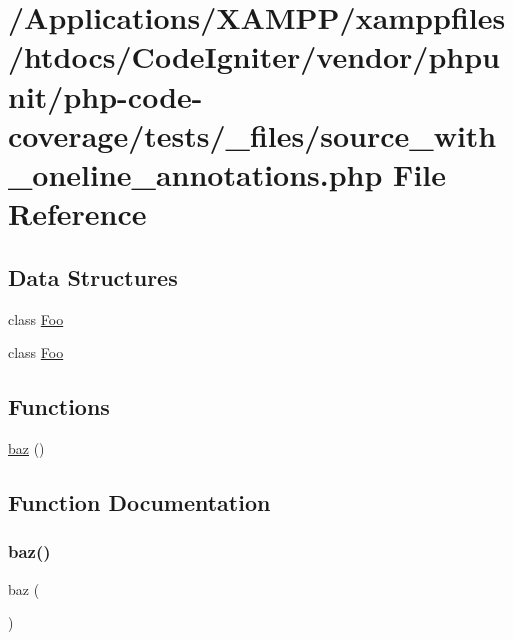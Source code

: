 \hypertarget{source__with__oneline__annotations_8php}{}\section{/\+Applications/\+X\+A\+M\+P\+P/xamppfiles/htdocs/\+Code\+Igniter/vendor/phpunit/php-\/code-\/coverage/tests/\+\_\+files/source\+\_\+with\+\_\+oneline\+\_\+annotations.php File Reference}
\label{source__with__oneline__annotations_8php}
\subsection*{Data Structures}
\begin{DoxyCompactItemize}
\item 
class \mbox{\hyperlink{class_foo}{Foo}}
\item 
class \mbox{\hyperlink{class_foo}{Foo}}
\end{DoxyCompactItemize}
\subsection*{Functions}
\begin{DoxyCompactItemize}
\item 
\mbox{\hyperlink{source__with__oneline__annotations_8php_ae7a58e6eb64e3fa0d88ff421f558d8f4}{baz}} ()
\end{DoxyCompactItemize}


\subsection{Function Documentation}
\mbox{\label{source__with__oneline__annotations_8php_ae7a58e6eb64e3fa0d88ff421f558d8f4}} 
\subsubsection{\texorpdfstring{baz()}{baz()}}
{\footnotesize\ttfamily baz (\begin{DoxyParamCaption}{ }\end{DoxyParamCaption})}

